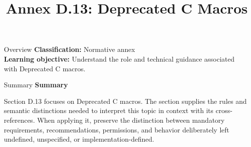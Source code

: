 \documentclass[10pt,letterpaper]{article}
\title{Annex D.13: Deprecated C Macros}
\author{}
\date{}
\begin{document}
\maketitle
\begin{CornellOverviewBox}{Overview}
\textbf{Classification:} Normative annex\\[2pt]
\textbf{Learning objective:} Understand the role and technical guidance associated with Deprecated C macros.
\end{CornellOverviewBox}\begin{CornellSummaryBox}{Summary}
{\sffamily\bfseries\color{Accent} Summary}\par\vspace{3pt}Section D.13 focuses on Deprecated C macros. The section supplies the rules and semantic distinctions needed to interpret this topic in context with its cross-references. When applying it, preserve the distinction between mandatory requirements, recommendations, permissions, and behavior deliberately left undefined, unspecified, or implementation-defined.
\end{CornellSummaryBox}
\end{document}
